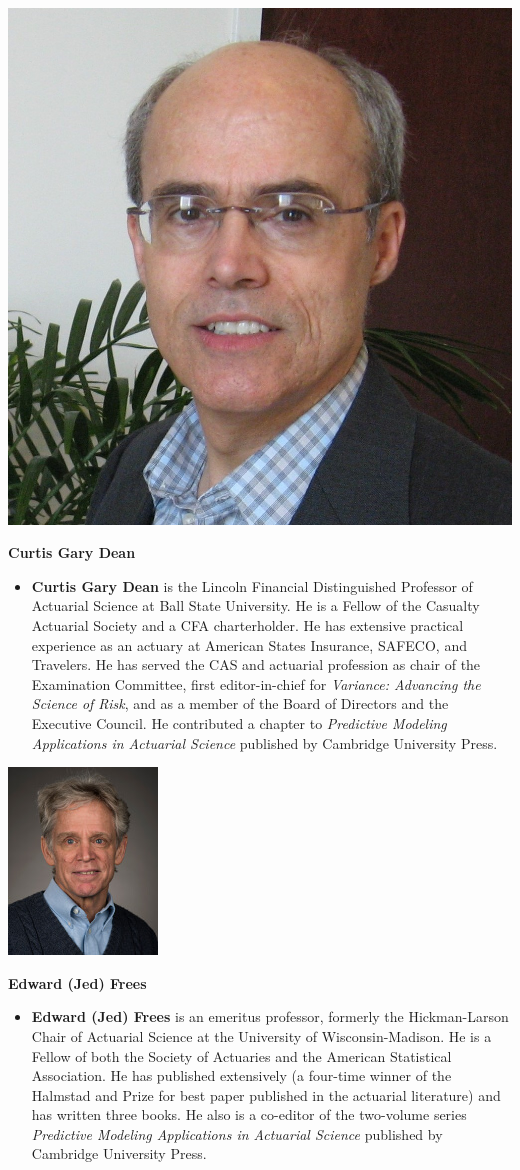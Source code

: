 \documentclass[
  12pt,
  krantz2]{Format/krantzNoCorner}
\providecommand{\tightlist}{%
  \setlength{\itemsep}{0pt}\setlength{\parskip}{0pt}}
\begin{document}
\begin{center}\includegraphics[width=0.2\linewidth,height=0.3\textheight]{ContributorPics/PhotoGaryDean} \end{center}

\begin{center}
\textbf{ Curtis Gary Dean }
\end{center}

\begin{itemize}
\tightlist
\item
  \textbf{Curtis Gary Dean} is the Lincoln Financial Distinguished Professor of Actuarial Science at Ball State University. He is a Fellow of the Casualty Actuarial Society and a CFA charterholder. He has extensive practical experience as an actuary at American States Insurance, SAFECO, and Travelers. He has served the CAS and actuarial profession as chair of the Examination Committee, first editor-in-chief for \emph{Variance: Advancing the Science of Risk}, and as a member of the Board of Directors and the Executive Council. He contributed a chapter to \emph{Predictive Modeling Applications in Actuarial Science} published by Cambridge University Press.
\end{itemize}

\begin{center}\includegraphics[width=0.2\linewidth,height=0.3\textheight]{ContributorPics/Frees_Jed2018_150x188} \end{center}

\begin{center}
\textbf{ Edward (Jed) Frees }
\end{center}

\begin{itemize}
\tightlist
\item
  \textbf{Edward (Jed) Frees} is an emeritus professor, formerly the Hickman-Larson Chair of Actuarial Science at the University of Wisconsin-Madison. He is a Fellow of both the Society of Actuaries and the American Statistical Association. He has published extensively (a four-time winner of the Halmstad and Prize for best paper published in the actuarial literature) and has written three books. He also is a co-editor of the two-volume series \emph{Predictive Modeling Applications in Actuarial Science} published by Cambridge University Press.
\end{itemize}
\end{document}
